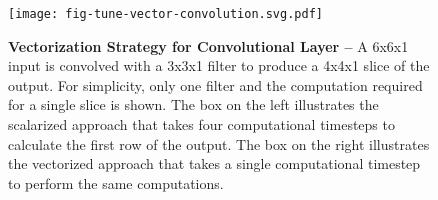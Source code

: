 
\begin{figure}[h]

  \centering
  \texttt{[image: fig-tune-vector-convolution.svg.pdf]}

  \caption{\textbf{Vectorization Strategy for Convolutional Layer --} A
    6x6x1 input is convolved with a 3x3x1 filter to produce a 4x4x1 slice
    of the output. For simplicity, only one filter and the computation
    required for a single slice is shown. The box on the left illustrates
    the scalarized approach that takes four computational timesteps to
    calculate the first row of the output. The box on the
    right illustrates the vectorized approach that takes a single
    computational timestep to perform the same computations.}

  \label{fig-tuning-vectorization-convolution}

\end{figure}
